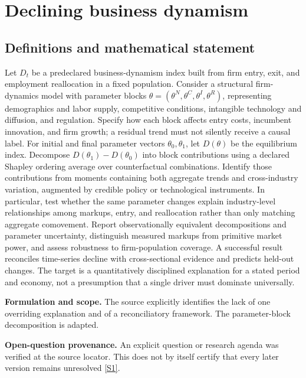 \documentclass[11pt]{article}
\newcommand{\sref}[2]{\hyperlink{source:#1:#2}{[S#2]}}
\begin{document}
\section*{Declining business dynamism}\label{30007546}
\subsection{Definitions and mathematical statement}
Let \(D_t\) be a predeclared business-dynamism index built from firm entry, exit, and employment reallocation in a fixed population. Consider a structural firm-dynamics model with parameter blocks \(\theta=(\theta^N,\theta^C,\theta^I,\theta^R)\), representing demographics and labor supply, competitive conditions, intangible technology and diffusion, and regulation. Specify how each block affects entry costs, incumbent innovation, and firm growth; a residual trend must not silently receive a causal label.
For initial and final parameter vectors \(\theta_0,\theta_1\), let \(D(\theta)\) be the equilibrium index. Decompose \(D(\theta_1)-D(\theta_0)\) into block contributions using a declared Shapley ordering average over counterfactual combinations. Identify those contributions from moments containing both aggregate trends and cross-industry variation, augmented by credible policy or technological instruments. In particular, test whether the same parameter changes explain industry-level relationships among markups, entry, and reallocation rather than only matching aggregate comovement.
Report observationally equivalent decompositions and parameter uncertainty, distinguish measured markups from primitive market power, and assess robustness to firm-population coverage. A successful result reconciles time-series decline with cross-sectional evidence and predicts held-out changes. The target is a quantitatively disciplined explanation for a stated period and economy, not a presumption that a single driver must dominate universally.

\par\textbf{Formulation and scope.} The source explicitly identifies the lack of one overriding explanation and of a reconciliatory framework. The parameter-block decomposition is adapted.

\par\textbf{Open-question provenance.} An explicit question or research agenda was verified at the source locator. This does not by itself certify that every later version remains unresolved \sref{30007546}{1}.
\end{document}
